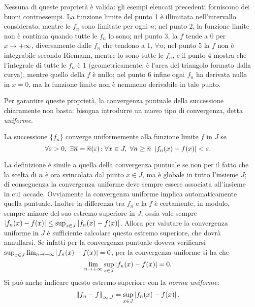Nessuna di queste proprietà è valida: gli esempi elencati precedenti forniscono dei buoni controesempi. La funzione limite del punto 1 è illimitata nell'intervallo considerato, mentre le $f_n$ sono limitate per ogni $n$; nel punto 2, la funzione limite non è continua quando tutte le $f_n$ lo sono; nel punto 3, la $f$ tende a 0 per $x\to+\infty$, diversamente dalle $f_n$ che tendono a 1, $\forall n$; nel punto 5 la $f$ non è integrabile secondo Riemann, mentre lo sono tutte le $f_n$, e il punto 4 mostra che l'integrale di tutte le $f_n$ è 1 (geometricamente, è l'area del triangolo formato dalla curva), mentre quello della $f$ è nullo; nel punto 6 infine ogni $f_n$ ha derivata nulla in $x=0$, ma la funzione limite non è nemmeno derivabile in tale punto.

Per garantire queste proprietà, la convergenza puntuale della successione chiaramente non basta: bisogna introdurre un nuovo tipo di convergenza, detta \emph{uniforme}.
\begin{definizione} \label{d:conv_uniforme_succ}
La successione $\{f_n\}$ converge uniformemente alla funzione limite $f$ in $J$ se
\begin{equation} \label{eq:conv_uniforme_succ}
\forall\epsilon>0,\ \exists\overline{n}=\overline{n}(\epsilon)\colon\forall x\in J,\ \forall n\geq\overline{n}\ \abs{f_n(x)-f(x)}<\epsilon.
\end{equation}
\end{definizione}
La definizione è simile a quella della convergenza puntuale se non per il fatto che la scelta di $\overline{n}$ è ora svincolata dal punto $x\in J$, ma è globale in tutto l'insieme $J$; di conseguenza la convergenza uniforme deve sempre essere associata all'insieme in cui accade. Ovviamente la convergenza uniforme implica automaticamente quella puntuale.
Inoltre la differenza tra $f_n$ e la $f$ è certamente, in modulo, sempre minore del suo estremo superiore in $J$, ossia vale sempre $\left|{f_n(x)-f(x)}\right|\leq\sup_{x\in J}\left|{f_n(x)-f(x)}\right|$. Allora per valutare la convergenza uniforme in $J$ è sufficiente calcolare questo estremo superiore, che dovrà annullarsi. Se infatti per la convergenza puntuale doveva verificarsi $\sup_{x\in J}\lim_{n\to+\infty}\left|{f_n(x)-f(x)}\right|=0$, per la convergenza uniforme si ha che
\begin{equation}
\lim_{n\to+\infty}\sup_{x\in J}\left|{f_n(x)-f(x)}\right|=0.
\end{equation}
Si può anche indicare questo estremo superiore con la \emph{norma uniforme}:
\[
\left\|{f_n-f}\right\|_{\infty,J}=\sup_{x\in J}\left|{f_n(x)-f(x)}\right|.
\]
